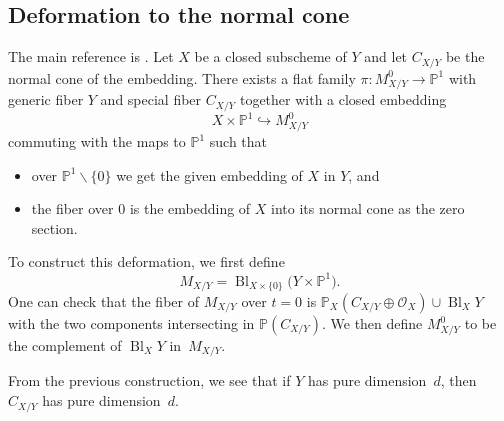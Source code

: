 \documentclass[pdftex]{sigma}
\numberwithin{equation}{section}
\newcommand{\PP}{\mathbb P}
\theoremstyle{plain}
\theoremstyle{definition}
\theoremstyle{remark}
\begin{document}
\subsection{Deformation to the normal cone}\label{sec:defnormal} The main reference is \cite[Chapter~5]{Fulton}. Let $X$ be a closed subscheme of $Y$ and let $C_{X/Y}$ be the normal cone of the embedding. There exists a flat family $\pi\colon M^0_{X/Y}\to \PP^1$ with generic fiber $Y$ and special fiber $C_{X/Y}$ together with a closed embedding
\[X\times \PP^1\hookrightarrow M^0_{X/Y}\]
 commuting with the maps to $\PP^1$ such that
 \begin{itemize}\itemsep=0pt
 \item over $\PP^1\backslash \{0\}$ we get the given embedding of $X$ in $Y$, and
 \item the fiber over $0$ is the embedding of $X$ into its normal cone as the zero section.
 \end{itemize}
To construct this deformation, we first define
\[M_{X/Y}=\operatorname{Bl}_{X\times \{0 \}} \big(Y\times \PP^1\big).\]
One can check that the fiber of $M_{X/Y}$ over $t=0$ is $\PP_X(C_{X/Y}\oplus \mathcal O_X)\cup\operatorname{Bl}_X Y$ with the two components intersecting in $\PP(C_{X/Y})$. We then define $M^0_{X/Y}$ to be the complement of $\operatorname{Bl}_X Y$ in~$M_{X/Y}$.
\begin{Remark}
From the previous construction, we see that if $Y$ has pure dimension~$d$, then~$C_{X/Y}$ has pure dimension~$d$.
\end{Remark}
\end{document}

